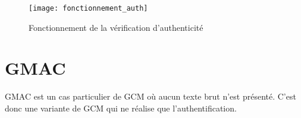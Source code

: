 \begin{figure}[!h]
  \centering
  \texttt{[image: fonctionnement\_auth]}
  \caption{Fonctionnement de la vérification d'authenticité}
  \label{Fonctionnement auth}
\end{figure}

\section{GMAC}

GMAC est un cas particulier de GCM où aucun texte brut n'est présenté. C'est donc une variante de GCM qui ne réalise que l'authentification.




